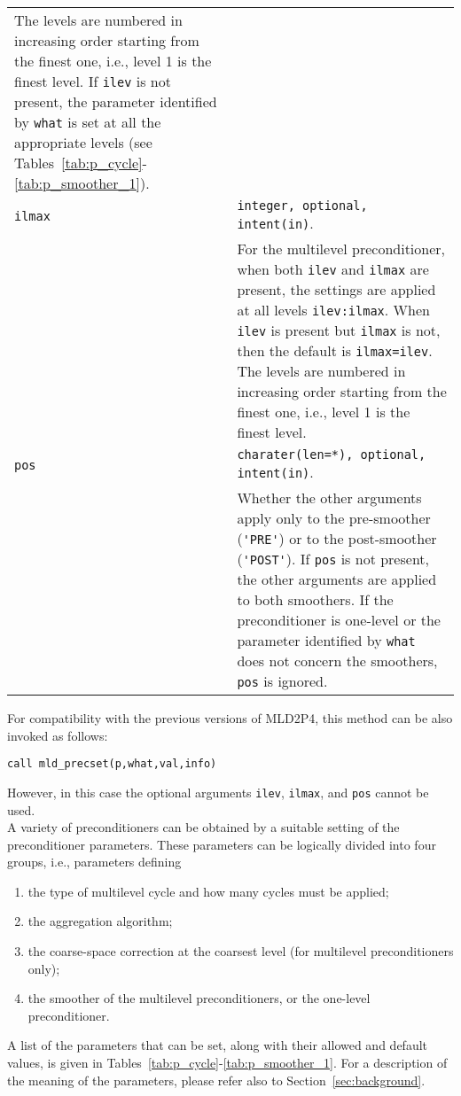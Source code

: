 \begin{tabular}{p{1.2cm}p{12cm}}
                The levels are numbered in increasing
                order starting from the finest one, i.e., level 1 is the finest level.
                If \verb|ilev| is not present, the parameter identified by \verb|what|
                is set at all the appropriate levels (see
                Tables~\ref{tab:p_cycle}-\ref{tab:p_smoother_1}).\\
\verb|ilmax|   & \verb|integer, optional, intent(in)|.\\
              & For the multilevel preconditioner, when both
                \verb|ilev| and \verb|ilmax| are present, the settings
                are applied at all levels \verb|ilev:ilmax|. When
                \verb|ilev| is present but \verb|ilmax| is not, then
                the default is \verb|ilmax=ilev|.
                The levels are numbered in increasing
                order starting from the finest one, i.e., level 1 is the finest level. \\
\verb|pos|   & \verb|charater(len=*), optional, intent(in)|.\\
              & Whether the other arguments apply only to the pre-smoother (\verb|'PRE'|)
                or to the post-smoother (\verb|'POST'|). If \verb|pos| is not present,
                the other arguments are applied to both smoothers.
                If the preconditioner is one-level or the parameter identified by \verb|what|
                does not concern the smoothers, \verb|pos| is ignored.
\end{tabular}

\baselineskip
For compatibility with the previous versions of MLD2P4, this method can be also invoked
as follows:

\begin{center}
\verb|call mld_precset(p,what,val,info)|
\end{center}

\noindent
However, in this case the optional arguments \verb|ilev|, \verb|ilmax|, and \verb|pos|
cannot be used. \\

A variety of preconditioners can be obtained
by a suitable setting of the preconditioner parameters. These parameters
can be logically divided into four groups, i.e., parameters defining
\begin{enumerate}
	\item the type of multilevel cycle and how many cycles must be applied;
        \item the aggregation algorithm;
        \item the coarse-space correction at the coarsest level (for multilevel
                 preconditioners only);
	\item the smoother of the multilevel preconditioners, or the one-level
                  preconditioner.
	
\end{enumerate}
A list of the parameters that can be set, along with their allowed and
default values, is given in Tables~\ref{tab:p_cycle}-\ref{tab:p_smoother_1}.
For a description of the meaning of the parameters, please
refer also to Section~\ref{sec:background}. \\

